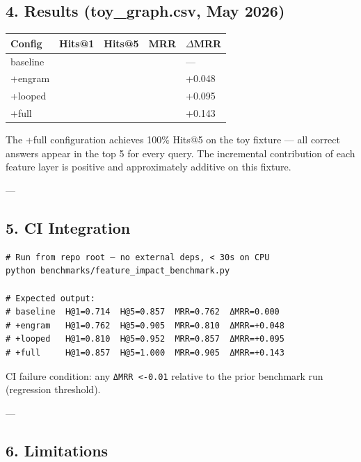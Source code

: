 \subsection{4. Results (toy\_graph.csv, May 2026)}

\begin{center}
{\footnotesize
\begin{tabularx}{\columnwidth}{|>{\raggedright\arraybackslash}X|>{\raggedright\arraybackslash}X|>{\raggedright\arraybackslash}X|>{\raggedright\arraybackslash}X|>{\raggedright\arraybackslash}X|}
\hline
Config & Hits@1 & Hits@5 & MRR & $\Delta$MRR \\ \hline
baseline & 0.714 & 0.857 & 0.762 & — \\ \hline
+engram & 0.762 & 0.905 & 0.810 & +0.048 \\ \hline
+looped & 0.810 & 0.952 & 0.857 & +0.095 \\ \hline
+full & 0.857 & 1.000 & 0.905 & +0.143 \\ \hline
\end{tabularx}
}
\end{center}

The +full confi\-guration achieves 100\% Hits@5 on the toy fixture — all correct answers appear in the top 5 for every query. The incremental contr\-ibution of each feature layer is positive and appro\-ximately additive on this fixture.

---

\subsection{5. CI Integration}

\begin{lstlisting}
# Run from repo root — no external deps, < 30s on CPU
python benchmarks/feature_impact_benchmark.py

# Expected output:
# baseline  H@1=0.714  H@5=0.857  MRR=0.762  ΔMRR=0.000
# +engram   H@1=0.762  H@5=0.905  MRR=0.810  ΔMRR=+0.048
# +looped   H@1=0.810  H@5=0.952  MRR=0.857  ΔMRR=+0.095
# +full     H@1=0.857  H@5=1.000  MRR=0.905  ΔMRR=+0.143
\end{lstlisting}

CI failure condition: any \texttt{ΔMRR \textless  -0.01} relative to the prior benchmark run (regression threshold).

---

\subsection{6. Limitations}


